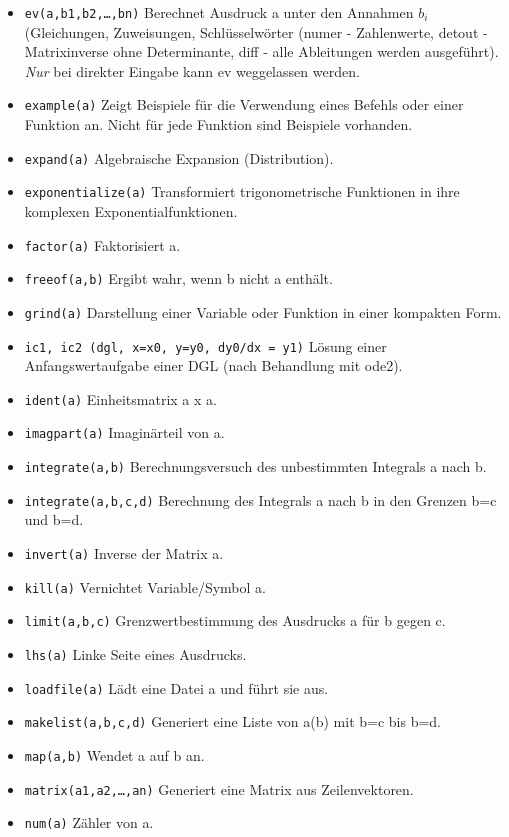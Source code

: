\documentclass[12pt]{scrartcl}
\begin{document}
\begin{itemize}
\item \texttt{ev(a,b1,b2,\ldots,bn)} Berechnet Ausdruck a unter den Annahmen $b_i$
  (Gleichungen, Zuweisungen, Schlüsselwörter (numer - Zahlenwerte,
  detout - Matrixinverse ohne Determinante, diff - alle Ableitungen
  werden ausgeführt). \emph{Nur} bei  direkter Eingabe kann ev weggelassen werden.
\item \texttt{example(a)} Zeigt Beispiele für die Verwendung eines
  Befehls oder einer  Funktion an. Nicht für jede Funktion sind Beispiele vorhanden.
\item \texttt{expand(a)} Algebraische Expansion (Distribution).
\item \texttt{exponentialize(a)} Transformiert trigonometrische Funktionen in ihre komplexen Exponentialfunktionen.
\item \texttt{factor(a)} Faktorisiert a.
\item \texttt{freeof(a,b)} Ergibt wahr, wenn b nicht a enthält.
\item \texttt{grind(a)} Darstellung einer Variable oder Funktion in einer kompakten Form.
\item \texttt{ic1, ic2 (dgl, x=x0, y=y0, dy0/dx = y1)} Lösung einer Anfangswertaufgabe einer DGL (nach Behandlung mit ode2).
\item \texttt{ident(a)} Einheitsmatrix a x a.
\item \texttt{imagpart(a)} Imaginärteil von a.
\item \texttt{integrate(a,b)} Berechnungsversuch des unbestimmten Integrals a nach b.
\item \texttt{integrate(a,b,c,d)} Berechnung des Integrals a nach b in den Grenzen b=c und b=d.
\item \texttt{invert(a)} Inverse der Matrix a.
\item \texttt{kill(a)} Vernichtet Variable/Symbol a.
\item \texttt{limit(a,b,c)} Grenzwertbestimmung des Ausdrucks a für b gegen c.
\item \texttt{lhs(a)} Linke Seite eines Ausdrucks.
\item \texttt{loadfile(a)} Lädt eine Datei a und führt sie aus.
\item \texttt{makelist(a,b,c,d)} Generiert eine Liste von a(b) mit  b=c
  bis  b=d.
\item \texttt{map(a,b)} Wendet a auf b an.
\item \texttt{matrix(a1,a2,\ldots,an)} Generiert eine Matrix aus  Zeilenvektoren.
\item \texttt{num(a)} Zähler von a.

\end{itemize}
\end{document}
